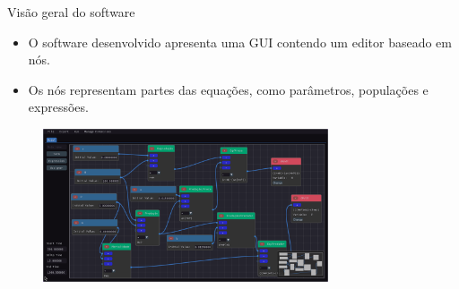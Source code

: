 \begin{frame}{Visão geral do software}
    \begin{itemize}
        \item O software desenvolvido apresenta uma GUI contendo um editor baseado em nós.
        \item Os nós representam partes das equações, como parâmetros, populações e expressões.
    \end{itemize}

    \begin{figure}
        \centering
        \includegraphics[width=0.75\textwidth]{contents/imgs/ode-designer/predador-presa-fit.png}
    \end{figure}
\end{frame}

